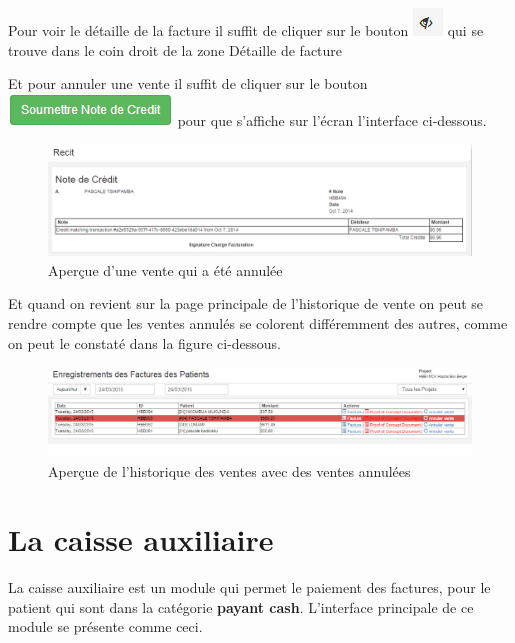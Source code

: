 \documentclass[12pt,a4paper]{report}
\begin{document}
Pour voir le détaille de la facture il suffit de cliquer sur le bouton \includegraphics[scale=0.7]{pic/SeeInvoice.png} qui se trouve dans le coin droit de la zone Détaille de facture   


Et pour annuler une vente il suffit de cliquer sur le bouton \includegraphics[scale=0.7]{pic/SubmitNoteCredit.png}  pour que s'affiche sur l'écran l'interface ci-dessous.

\begin{figure}[h]
\begin{center}
\includegraphics[width=14cm]{pic/RecetteCredit.png}
\end{center}
\caption{Aperçue d'une vente qui a été annulée}
\label{Aperçue d'une vente qui a été annulée}
\end{figure}

Et quand on revient sur la page principale de l'historique de vente on peut se rendre compte que les ventes annulés se colorent différemment des autres, comme on peut le constaté dans la figure ci-dessous.

\begin{figure}[h]
\begin{center}
\includegraphics[width=14cm]{pic/HistoriqueVenteDell.png}
\end{center}
\caption{Aperçue de l'historique des ventes avec des ventes annulées}
\label{Aperçue de l'historique des ventes avec des ventes annulées}
\end{figure}

\section{La caisse auxiliaire}
La caisse auxiliaire est un module qui permet le paiement des factures, pour le patient qui sont dans la catégorie \textbf{payant cash}. L'interface principale de ce module se présente comme ceci.
\end{document}
